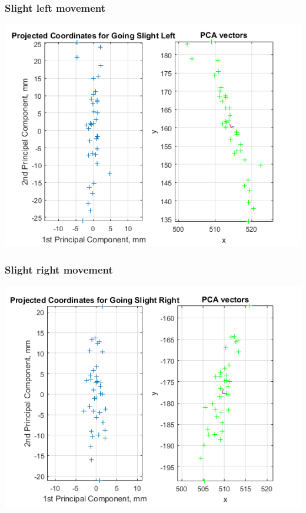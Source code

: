 \documentclass[a4paper, 12pt]{article}
\begin{document}
\subsubsection{Slight left movement}

\begin{center}
  \includegraphics[scale=0.8]{l1}
\end{center}


\subsubsection{Slight right movement}

\begin{center}
  \includegraphics[scale=0.8]{r1}
\end{center}
\end{document}
